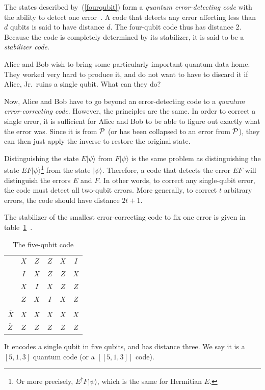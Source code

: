 The states described by~(\ref{fourqubit}) form a {\em quantum
error-detecting code} with the ability to detect one
error~\cite{detect,erasure}.  A code that detects any error affecting
less than $d$ qubits is said to have distance $d$.  The four-qubit
code thus has distance 2.  Because the code is completely determined
by its stabilizer, it is said to be a {\em stabilizer code}.

\begin{example}
Alice and Bob wish to bring some particularly important quantum data
home.  They worked very hard to produce it, and do not want to have to
discard it if Alice, Jr.\ ruins a single qubit.  What can they do?
\end{example}

Now, Alice and Bob have to go beyond an error-detecting code to a {\em
quantum error-correcting code}.  However, the principles are the
same.  In order to correct a single error, it is sufficient for Alice
and Bob to be able to figure out exactly what the error was.  Since it
is from ${\cal P}$ (or has been collapsed to an error from ${\cal
P}$), they can then just apply the inverse to restore the original
state.

Distinguishing the state $E |\psi\rangle$ from $F |\psi\rangle$ is the
same problem as distinguishing the state $E F
|\psi\rangle$\footnote{Or more precisely, $E^\dagger F |\psi\rangle$,
which is the same for Hermitian $E$.} from the state $|\psi\rangle$.
Therefore, a code that detects the error $E F$ will distinguish the
errors $E$ and $F$.  In other words, to correct any single-qubit
error, the code must detect all two-qubit errors.  More generally, to
correct $t$ arbitrary errors, the code should have distance $2t + 1$.

The stabilizer of the smallest error-correcting code to fix one error
is given in table~\ref{table:fivequbit}~\cite{LANL:5qubit,IBM:5qubit}.
\begin{table}
\centering
\begin{tabular}{lccccc}
& $X$ & $Z$ & $Z$ & $X$ & $I$ \\
& $I$ & $X$ & $Z$ & $Z$ & $X$ \\
& $X$ & $I$ & $X$ & $Z$ & $Z$ \\
& $Z$ & $X$ & $I$ & $X$ & $Z$ \\
\\
$\overline{X}$ & $X$ & $X$ & $X$ & $X$ & $X$ \\
$\overline{Z}$ & $Z$ & $Z$ & $Z$ & $Z$ & $Z$
\end{tabular}
\caption{The five-qubit code}
\label{table:fivequbit}
\end{table}
It encodes a single qubit in five qubits, and has distance three.  We
say it is a $[5, 1, 3]$ quantum code (or a $[[5, 1, 3]]$ code).

